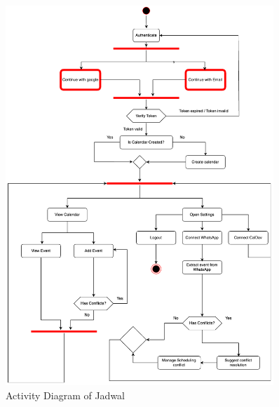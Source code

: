 \begin{figure}[!h]
    \centering
    \includegraphics[width=0.9\textwidth]{images/activity-diagram.png}
    \caption{Activity Diagram of Jadwal}
    \label{fig:activity-diagram}
\end{figure}